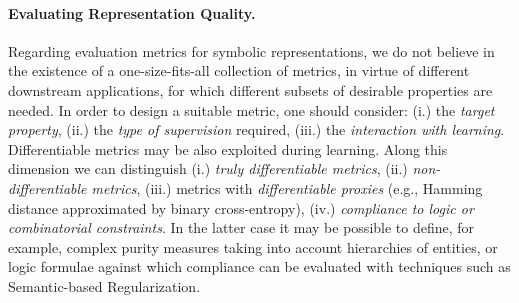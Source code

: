 \paragraph{Evaluating Representation Quality.} Regarding evaluation metrics for symbolic representations, we do not believe in the existence of a one-size-fits-all collection of metrics, in virtue of different downstream applications, for which different subsets of desirable properties are needed. 
In order to design a suitable metric, one should consider: (i.) the \textit{target property}, (ii.) the \textit{type of supervision} required, (iii.) the \textit{interaction with learning}.
%
Differentiable metrics may be also exploited during learning. Along this dimension we can distinguish (i.) \textit{truly differentiable metrics}, (ii.) \textit{non-differentiable metrics}, (iii.) metrics with \textit{differentiable proxies} (e.g., Hamming distance approximated by binary cross-entropy), (iv.) \textit{compliance to logic or combinatorial constraints}.
In the latter case it may be possible to define, for example, complex purity measures taking into account hierarchies of entities, or logic formulae against which compliance can be evaluated with techniques such as Semantic-based Regularization.

